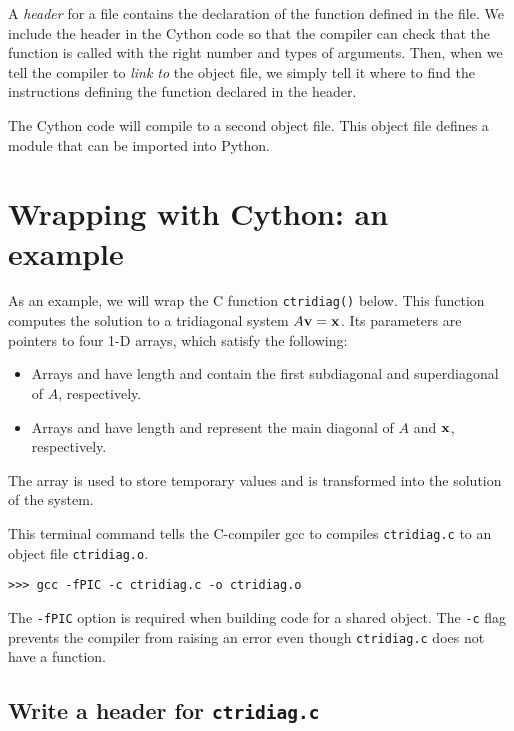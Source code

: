 A \emph{header} for a file contains the declaration of the function defined in the file.
We include the header in the Cython code so that the compiler can check that the function is called with the right number and types of arguments.
Then, when we tell the compiler to \emph{link to} the object file, we simply tell it where to find the instructions defining the function declared in the header.

The Cython code will compile to a second object file.
This object file defines a module that can be imported into Python.

\section*{Wrapping with Cython: an example}
As an example, we will wrap the C function \texttt{ctridiag()} below.
This function computes the solution to a tridiagonal system $A{\bf v} = {\bf x}$.
Its parameters are pointers to four 1-D arrays, which satisfy the following:
\begin{itemize}
\item Arrays  and  have length  and contain the first subdiagonal and superdiagonal of $A$, respectively.
\item Arrays  and  have length  and represent the main diagonal of $A$ and ${\bf x}$, respectively.
\end{itemize}
The array  is used to store temporary values and  is transformed into the solution of the system.



This terminal command tells the C-compiler gcc to compiles \texttt{ctridiag.c} to an object file \texttt{ctridiag.o}.

\begin{lstlisting}
>>> gcc -fPIC -c ctridiag.c -o ctridiag.o
\end{lstlisting}
The \texttt{-fPIC} option is required when building code for a shared object.
The \texttt{-c} flag prevents the compiler from raising an error even though \texttt{ctridiag.c} does not have a  function.




\subsection*{Write a header for \texttt{ctridiag.c}}


